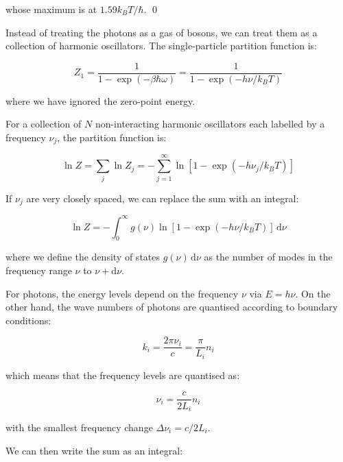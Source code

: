 \documentclass[12pt]{article}
\begin{document}
whose maximum is at $1.59 k_{B}T/\hbar$.
\qed


Instead of treating the photons as a gas of bosons, we can treat them as a collection of harmonic oscillators. The single-particle partition function is:

\begin{equation}
    Z_{1} = \frac{1}{1 - \exp\left( -\beta \hbar \omega \right)} = \frac{1}{1 - \exp\left( -h\nu/k_{B}T \right)}
\end{equation}

where we have ignored the zero-point energy.

For a collection of $N$ non-interacting harmonic oscillators each labelled by a frequency $\nu_{j}$, the partition function is:

\begin{equation}
    \ln{Z} = \sum_{j} \ln{Z_{j}} = -\sum_{j = 1}^{\infty} \ln{\left[ 1 - \exp\left( -h \nu_{j}/k_{B}T \right) \right]}
\end{equation}

If $\nu_{j}$ are very closely spaced, we can replace the sum with an integral:

\begin{equation}
    \ln{Z} = -\int_{0}^{\infty} g(\nu) \ln{\left[ 1 - \exp\left( -h \nu/k_{B}T \right) \right]} \, \mathrm{d}\nu
\end{equation}

where we define the density of states $g(\nu) \, \mathrm{d}\nu$ as the number of modes in the frequency range $\nu$ to $\nu + \mathrm{d}\nu$.

For photons, the energy levels depend on the frequency $\nu$ via $E = h \nu$. On the other hand, the wave numbers of photons are quantised according to boundary conditions:

\begin{equation}
    k_{i} = \frac{2\pi \nu_{i}}{c} = \frac{\pi}{L_{i}} n_{i}
\end{equation}

which means that the frequency levels are quantised as:

\begin{equation}
    \nu_{i} = \frac{c}{2L_{i}} n_{i}
\end{equation}

with the smallest frequency change $\Delta \nu_{i} = c/2L_{i}$.

We can then write the sum as an integral:
\end{document}
